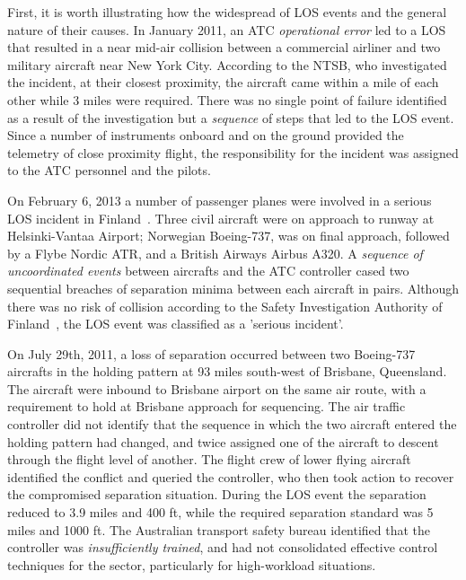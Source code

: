 \documentclass[letter,onecolumn,12pt]{aiaa-tc}
\newcommand{\1}{1_n}
\begin{document}
First, it is worth illustrating how the widespread of LOS events and the general nature of their causes. In January 2011, an ATC \emph{operational error} led to a LOS that resulted in a near mid-air collision  between a commercial airliner and two military aircraft near New York City. According to the NTSB\cite{OIG_AR2013}, who investigated the incident, at their closest proximity, the aircraft came within a mile of each other while 3 miles were required. There was no single point of failure identified as a result of the investigation but a \emph{sequence} of steps that led to the LOS event. Since a number of instruments onboard and on the ground provided the telemetry of close proximity flight, the responsibility for the incident was assigned to the ATC personnel and the pilots.

On February 6, 2013  a number of  passenger planes were involved in a serious LOS incident in Finland~\cite{Vantaa_IR2013}.  Three civil aircraft were on approach to runway at Helsinki-Vantaa Airport; Norwegian Boeing-737, was on final approach, followed by a Flybe Nordic ATR, and a British Airways Airbus A320. A \emph{sequence of uncoordinated events} between aircrafts and the ATC controller cased two sequential breaches of separation minima between each aircraft in pairs. Although there was no risk of collision according to the Safety Investigation Authority of Finland~\cite{Vantaa_IR2013}, the LOS event was classified as a 'serious incident'.

On July 29th, 2011, a loss of separation occurred between two Boeing-737 aircrafts in the holding pattern at 93 miles south-west of Brisbane, Queensland\cite{Brisbane_ATSR2011}. The aircraft were inbound to Brisbane airport on the same air route, with a requirement to hold at Brisbane approach for sequencing. The air traffic controller did not identify that the sequence in which the two aircraft entered the holding pattern had changed, and twice assigned one of the aircraft to descent through the flight level of another. The flight crew of lower flying aircraft identified the conflict and queried the controller, who then took action to recover the compromised separation situation. During the LOS event the separation reduced to 3.9 miles and 400 ft, while the required separation standard was 5 miles and 1000 ft. The Australian transport safety bureau identified that the controller was \emph{insufficiently trained}, and had not consolidated effective control techniques for the sector, particularly for high-workload situations.
\end{document}
